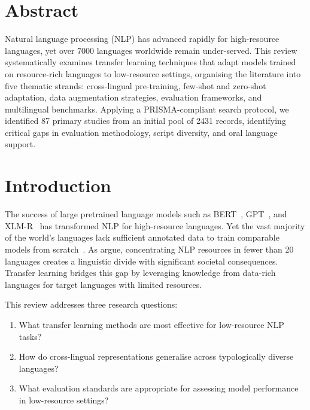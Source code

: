 \documentclass[
    language=english,
    doctype=article,
    institution=none,
    titlestyle=book,
]{../../omnilatex}
\begin{document}
\maketitle

\section*{Abstract}
Natural language processing (NLP) has advanced rapidly for high-resource
languages, yet over 7000 languages worldwide remain under-served.  This review
systematically examines transfer learning techniques that adapt models trained on
resource-rich languages to low-resource settings, organising the literature into
five thematic strands: cross-lingual pre-training, few-shot and zero-shot
adaptation, data augmentation strategies, evaluation frameworks, and multilingual
benchmarks.  Applying a PRISMA-compliant search protocol, we identified 87
primary studies from an initial pool of 2431 records, identifying critical gaps
in evaluation methodology, script diversity, and oral language support.

\section{Introduction}
\label{sec:introduction}
The success of large pretrained language models such as
BERT~\cite{devlin2019bert}, GPT~\cite{brown2020gpt3}, and
XLM-R~\cite{conneau2020xlmr} has transformed NLP for high-resource languages.
Yet the vast majority of the world's languages lack sufficient annotated data to
train comparable models from scratch~\cite{jurafsky2023speech}.  As
\textcite{bender2021stochastic} argue, concentrating NLP resources in fewer than
20 languages creates a linguistic divide with significant societal consequences.
Transfer learning bridges this gap by leveraging knowledge from data-rich
languages for target languages with limited resources.

This review addresses three research questions:
\begin{enumerate}
    \item \label{rq:methods} What transfer learning methods are most effective
          for low-resource NLP tasks?
    \item \label{rq:generalise} How do cross-lingual representations generalise
          across typologically diverse languages?
    \item \label{rq:evaluate} What evaluation standards are appropriate for
          assessing model performance in low-resource settings?
\end{enumerate}
\end{document}
